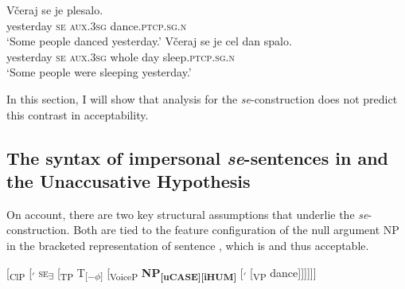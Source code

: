 \documentclass[output=paper,nonflat,newtxmath]{langsci/langscibook}
\begin{document}
\begin{exe}
\ex \begin{xlist} \label{ex:lenardic: 12}
\ex \label{ex:lenardic: 12a} \gll Včeraj se je plesalo.\\
yesterday \textsc{se} \textsc{aux}.\textsc{3sg} dance.\textsc{ptcp.sg.n}\\
\trans `Some people danced yesterday.'
\ex \gll Včeraj se je cel dan spalo.\\
yesterday \textsc{se} \textsc{aux}.\textsc{3sg} whole day sleep.\textsc{ptcp.sg.n}\\
\trans `Some people were sleeping yesterday.'
\end {xlist}
\ex \label{ex:lenardic: 13}
\begin{xlist}
 \label{VcUm}
\end{xlist}
\end{exe}

\noindent In this section, I will show that  analysis for the   \textit{se}-construction does not predict this contrast in acceptability.

\subsection{The syntax of impersonal \textit{se}-sentences in \citet{riverosheppard2003} and the Unaccusative Hypothesis} \label{sec3.2}
On  account, there are two key structural assumptions that underlie the  \textit{se}-construction. Both are tied to the feature configuration of the null argument NP in the  bracketed representation  of sentence , which is  and thus acceptable.

\begin{exe}
\ex \label{ex:lenardic: 14} {[\textsubscript{ClP} [\textsubscript{$'$} \textsc{se}\textsubscript{\textbf{$\exists$}} [\textsubscript{TP} T\textsubscript{[$-\phi$]} [\textsubscript{VoiceP} \textbf{NP}\textsubscript{\textbf{[uCASE][iHUM]}} [\textsubscript{$'$}  [\textsubscript{VP} dance]]]]]]}
\end{exe}
\end{document}
